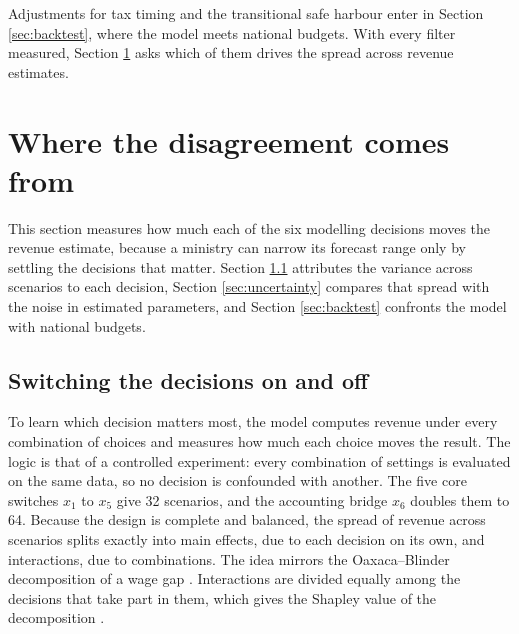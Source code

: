 \documentclass[11pt,a4paper]{article}
\begin{document}
Adjustments for tax timing and the transitional safe harbour enter in Section \ref{sec:backtest}, where the model meets national budgets. With every filter measured, Section \ref{sec:decomposition} asks which of them drives the spread across revenue estimates.

\section{Where the disagreement comes from}\label{sec:decomposition}

This section measures how much each of the six modelling decisions moves the revenue estimate, because a ministry can narrow its forecast range only by settling the decisions that matter. Section \ref{sec:factorial} attributes the variance across scenarios to each decision, Section \ref{sec:uncertainty} compares that spread with the noise in estimated parameters, and Section \ref{sec:backtest} confronts the model with national budgets.

\subsection{Switching the decisions on and off}\label{sec:factorial}

To learn which decision matters most, the model computes revenue under every combination of choices and measures how much each choice moves the result. The logic is that of a controlled experiment: every combination of settings is evaluated on the same data, so no decision is confounded with another. The five core switches $x_1$ to $x_5$ give 32 scenarios, and the accounting bridge $x_6$ doubles them to 64. Because the design is complete and balanced, the spread of revenue across scenarios splits exactly into main effects, due to each decision on its own, and interactions, due to combinations. The idea mirrors the Oaxaca–Blinder decomposition of a wage gap \citep{oaxaca1973,blinder1973}. Interactions are divided equally among the decisions that take part in them, which gives the Shapley value of the decomposition \citep{shorrocks2013}.
\end{document}
